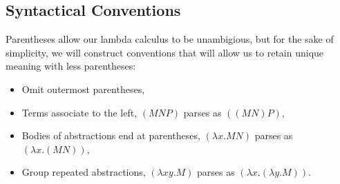 \subsection{Syntactical Conventions}

Parentheses allow our lambda calculus to be unambigious, but for the sake
of simplicity, we will construct conventions that will allow us to retain
unique meaning with less parentheses: \begin{itemize}
    \item Omit outermost parentheses,
    \item Terms associate to the left, $(MNP)$ parses as $((MN)P)$,
    \item Bodies of abstractions end at parentheses, $(\lambda x.MN)$
        parses as $(\lambda x.(MN))$,
    \item Group repeated abstractions, $(\lambda xy.M)$ 
        parses as $(\lambda x.(\lambda y.M))$.
\end{itemize}